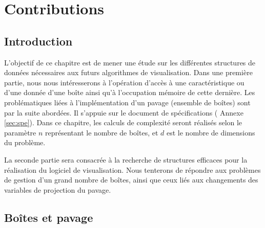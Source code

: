 \chapter{Contributions}\label{chap:con}


\section{Introduction}%

L'objectif de ce chapitre est de mener une étude sur les différentes structures de données nécessaires aux futurs algorithmes de visualisation. Dans une première partie, nous nous intéresserons à l'opération d'accès à une caractéristique ou d'une donnée d'une boîte ainsi qu'à l'occupation mémoire de cette dernière. Les problématiques liées à l'implémentation d'un pavage (ensemble de boîtes) sont par la suite abordées. Il s'appuie sur le document de spécifications (\cf{}  Annexe \ref{sec:spe}). Dans ce chapitre, les calculs de complexité seront réalisés selon le paramètre $n$  représentant le nombre de boîtes, et $d$ est le nombre de dimensions du problème.


La seconde partie sera consacrée à la recherche de structures efficaces pour la réalisation du logiciel de visualisation. Nous tenterons de répondre aux problèmes de gestion d'un grand nombre de boîtes, ainsi que ceux liés aux changements des variables de projection du pavage.




\section{Boîtes et pavage}

